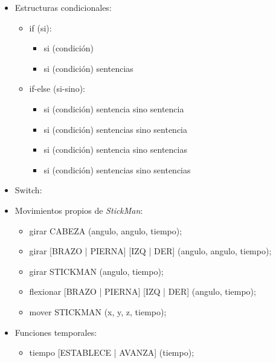 \begin{itemize}
      \item Estructuras condicionales:
            \begin{itemize}
               \item if (si):
                     \begin{itemize}
                        \item si (condición) 
                        \item si (condición) { sentencias } 
                     \end{itemize}
               \item if-else (si-sino):
                     \begin{itemize}
                        \item si (condición) sentencia sino sentencia 
                        \item si (condición) { sentencias } sino sentencia 
                        \item si (condición) sentencia sino { sentencias } 
                        \item si (condición) { sentencias } sino { sentencias } 
                     \end{itemize}
            \end{itemize}
      \item Switch:
      \item Movimientos propios de \textit{StickMan}:
            \begin{itemize}
               \item girar CABEZA (angulo, angulo, tiempo);
               \item girar [BRAZO | PIERNA] [IZQ | DER] (angulo, angulo, tiempo);
               \item girar STICKMAN (angulo, tiempo);
               \item flexionar [BRAZO | PIERNA] [IZQ | DER] (angulo, tiempo);
               \item mover STICKMAN (x, y, z, tiempo);
            \end{itemize} 
      \item Funciones temporales:
            \begin{itemize}
               \item tiempo [ESTABLECE | AVANZA] (tiempo);
            \end{itemize}
   \end{itemize}






















